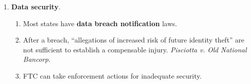 \begin{enumerate}
\begin{enumerate}
\begin{enumerate}
            COPPA---even if the site doesn't know the identity of the child.
        \end{enumerate}
        \item \textbf{Defining PII}.
        \begin{enumerate}
            \item We lack a uniform definition.
            \item Three approaches:\footnote{Casebook p. 873.}
            \begin{enumerate}
                \item Tautological: PII identifies people.
                \item Non-public: any non-public information is personally 
                identifying.
                \item Specific types: list data fields that count as PII.
            \end{enumerate}
            \item Paul Ohm: abandon PII.\footnote{Casebook p. 877.}
            \item Solove and Schwartz: identifiability (and risk) is a 
            continuum. More identifiability means more risk.
            \item FTC staff report: when is information not ``reasonably 
            linkable'' to a person?---When companies do not re-identify it.
            \item Takeaway: lots of legal uncertainty about the definition of 
            PII, here and abroad. EU may have broader definitions.
            \item \textbf{Zip codes} can be PII. \emph{Pineda v. 
            Williams-Sonoma}.
        \end{enumerate}
    \end{enumerate}
    \item \textbf{Data security}.
    \begin{enumerate}
        \item Most states have \textbf{data breach notification} laws.
        \item After a breach, ``allegations of increased risk of future 
        identity theft'' are not sufficient to establish a compensable injury. 
        \emph{Pisciotta v. Old National Bancorp}.
        \item FTC can take enforcement actions for inadequate security.
    \end{enumerate}
\end{enumerate}


